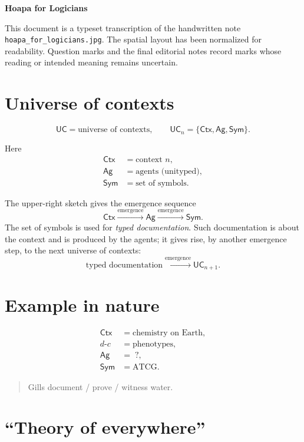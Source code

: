 \documentclass[10pt]{article}
\newcommand{\UC}{\mathsf{UC}}
\newcommand{\Ctx}{\mathsf{Ctx}}
\newcommand{\Ag}{\mathsf{Ag}}
\newcommand{\Sym}{\mathsf{Sym}}
\begin{document}
\begin{center}
  {\Large\bfseries Hoapa for Logicians}
\end{center}
\vspace{0.25em}

\noindent
This document is a typeset transcription of the handwritten note
\texttt{hoapa\_for\_logicians.jpg}. The spatial layout has been normalized
for readability. Question marks and the final editorial notes record marks
whose reading or intended meaning remains uncertain.

\section*{Universe of contexts}

\[
  \UC = \text{universe of contexts},
  \qquad
  \UC_n = \{\Ctx,\Ag,\Sym\}.
\]

Here
\begin{align*}
  \Ctx & = \text{context } n, \\
  \Ag  & = \text{agents (unityped)}, \\
  \Sym & = \text{set of symbols}.
\end{align*}

The upper-right sketch gives the emergence sequence
\[
  \Ctx \xrightarrow{\text{emergence}} \Ag
       \xrightarrow{\text{emergence}} \Sym.
\]
The set of symbols is used for \emph{typed documentation}. Such
documentation is about the context and is produced by the agents; it gives
rise, by another emergence step, to the next universe of contexts:
\[
  \text{typed documentation}
  \xrightarrow{\text{emergence}} \UC_{n+1}.
\]

\section*{Example in nature}

\begin{align*}
  \Ctx              & = \text{chemistry on Earth}, \\
  d\text{-}c         & = \text{phenotypes}, \\
  \Ag                & = \;?, \\
  \Sym               & = \mathrm{ATCG}.
\end{align*}

\begin{quote}
  Gills document / prove / witness water.
\end{quote}

\section*{\textquotedblleft Theory of everywhere\textquotedblright}
\end{document}
